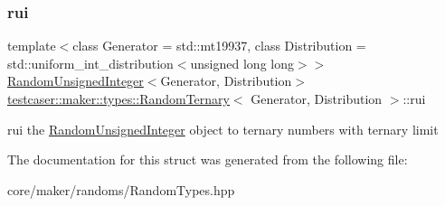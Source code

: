 \subsubsection{\texorpdfstring{rui}{rui}}
{\footnotesize\ttfamily template$<$class Generator = std\+::mt19937, class Distribution = std\+::uniform\+\_\+int\+\_\+distribution$<$unsigned long long$>$$>$ \\
\mbox{\hyperlink{classtestcaser_1_1maker_1_1types_1_1RandomUnsignedInteger}{Random\+Unsigned\+Integer}}$<$Generator, Distribution$>$ \mbox{\hyperlink{structtestcaser_1_1maker_1_1types_1_1RandomTernary}{testcaser\+::maker\+::types\+::\+Random\+Ternary}}$<$ Generator, Distribution $>$\+::rui}



rui the \mbox{\hyperlink{classtestcaser_1_1maker_1_1types_1_1RandomUnsignedInteger}{Random\+Unsigned\+Integer}} object to ternary numbers with ternary limit 



The documentation for this struct was generated from the following file\+:\begin{DoxyCompactItemize}
\item 
core/maker/randoms/Random\+Types.\+hpp\end{DoxyCompactItemize}
